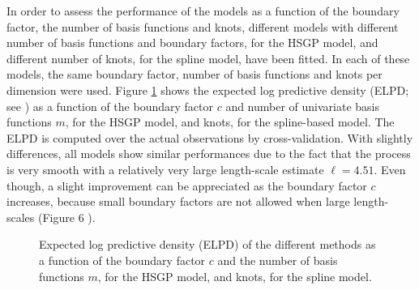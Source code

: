 \documentclass[onecolumn,a4paper,11pt]{article}
\begin{document}
In order to assess the performance of the models as a function of the boundary factor, the number of basis functions and knots, different models with different number of basis functions and boundary factors, for the HSGP model, and different number of knots, for the spline model, have been fitted. In each of these models, the same boundary factor, number of basis functions and knots per dimension were used. Figure \ref{ch5_fig19_ELPD_diabetes} shows the expected log predictive density (ELPD; see \cite{vehtari_2012}) as a function of the boundary factor $c$ and number of univariate basis functions $m$, for the HSGP model, and knots, for the spline-based model. The ELPD is computed over the actual observations by cross-validation. With slightly differences, all models show similar performances due to the fact that the process is very smooth with a relatively very large length-scale estimate $\ell=4.51$. Even though, a slight improvement can be appreciated as the boundary factor $c$ increases, because small boundary factors are not allowed when large length-scales (Figure 6%
).
%
\begin{figure}
\centering
{}
\caption{Expected log predictive density (ELPD) of the different methods as a function of the boundary factor $c$ and the number of basis functions $m$, for the HSGP model, and knots, for the spline model.}
  \label{ch5_fig19_ELPD_diabetes}
\end{figure}
\end{document}
